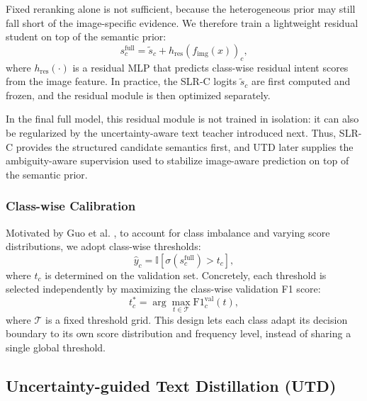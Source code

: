 Fixed reranking alone is not sufficient, because the heterogeneous prior may still fall short of the image-specific evidence. We therefore train a lightweight residual student on top of the semantic prior:
\begin{equation}
s^{\text{full}}_c = \tilde{s}_c + h_{\text{res}}(f_{\text{img}}(x))_c,
\end{equation}
where $h_{\text{res}}(\cdot)$ is a residual MLP that predicts class-wise residual intent scores from the image feature. In practice, the SLR-C logits $\tilde{s}_c$ are first computed and frozen, and the residual module is then optimized separately.

In the final full model, this residual module is not trained in isolation: it can also be regularized by the uncertainty-aware text teacher introduced next. Thus, SLR-C provides the structured candidate semantics first, and UTD later supplies the ambiguity-aware supervision used to stabilize image-aware prediction on top of the semantic prior.

\subsubsection{Class-wise Calibration}

Motivated by Guo et al. \cite{guo_calibration_2017}, to account for class imbalance and varying score distributions, we adopt class-wise thresholds:
\begin{equation}
\hat{y}_c = \mathbb{I}[\sigma(s^{\text{full}}_c) > t_c],
\end{equation}
where $t_c$ is determined on the validation set. Concretely, each threshold is selected independently by maximizing the class-wise validation F1 score:
\begin{equation}
t_c^\ast = \arg\max_{t \in \mathcal{T}} \text{F1}_c^{\text{val}}(t),
\end{equation}
where $\mathcal{T}$ is a fixed threshold grid. This design lets each class adapt its decision boundary to its own score distribution and frequency level, instead of sharing a single global threshold.

\subsection{Uncertainty-guided Text Distillation (UTD)}


